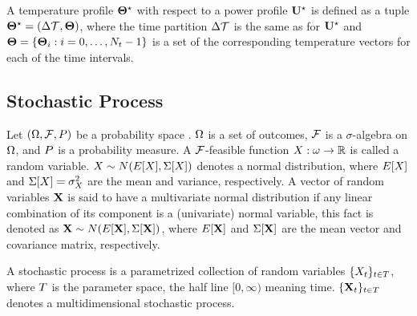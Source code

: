 A temperature profile $\mathbf{\Theta}^\star$ with respect to a power profile $\mathbf{U}^\star$ is defined as a tuple $\mathbf{\Theta}^\star = (\Delta \mathcal{T}, \mathbf{\Theta})$, where the time partition $\Delta \mathcal{T}$ is the same as for $\mathbf{U}^\star$ and $\mathbf{\Theta} = \{ \mathbf{\Theta}_i: i = 0, \dots, N_t - 1 \}$ is a set of the corresponding temperature vectors for each of the time intervals.

\subsection{Stochastic Process}
Let $(\Omega, \mathcal{F}, P)$ be a probability space \cite{oksendal2003}. $\Omega$ is a set of outcomes, $\mathcal{F}$ is a $\sigma$-algebra on $\Omega$, and $P$ is a probability measure. A $\mathcal{F}$-feasible function $X: \omega \to \mathbb{R}$ is called a random variable. $X \sim N(E[X], \Sigma[X])$ denotes a normal distribution, where $E[X]$ and $\Sigma[X] = \sigma_{X}^2$ are the mean and variance, respectively. A vector of random variables $\mathbf{X}$ is said to have a multivariate normal distribution if any linear combination of its component is a (univariate) normal variable, this fact is denoted as $\mathbf{X} \sim N(E[\mathbf{X}], \Sigma[\mathbf{X}])$, where $E[\mathbf{X}]$ and $\Sigma[\mathbf{X}]$ are the mean vector and covariance matrix, respectively.

A stochastic process is a parametrized collection of random variables $\{ X_t \}_{t \in T}$, where $T$ is the parameter space, the half line $[0, \infty)$ meaning time. $\{ \mathbf{X}_t \}_{t \in T}$ denotes a multidimensional stochastic process.
